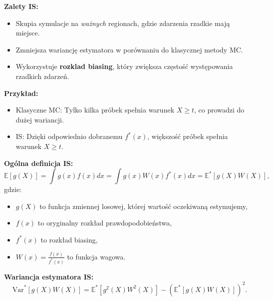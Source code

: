 \documentclass{beamer}
\begin{document}
\begin{frame}
    \textbf{Zalety IS:}
    \begin{itemize}
        \item Skupia symulacje na \textit{ważnych} regionach, gdzie zdarzenia rzadkie mają miejsce.
        \item Zmniejsza wariancję estymatora w porównaniu do klasycznej metody MC.
        \item Wykorzystuje \textbf{rozklad biasing}, który zwiększa częstość występowania rzadkich zdarzeń.
    \end{itemize}

    \vspace{0.5cm}
    \textbf{Przykład:}
    \begin{itemize}
        \item Klasyczne MC: Tylko kilka próbek spełnia warunek $X \geq t$, co prowadzi do dużej wariancji.
        \item IS: Dzięki odpowiednio dobranemu $f^*(x)$, większość próbek spełnia warunek $X \geq t$.
    \end{itemize}
\end{frame}

\begin{frame}
    \textbf{Ogólna definicja IS:}
    \[
    \mathbb{E}[g(X)] = \int g(x)f(x)dx = \int g(x)W(x)f^*(x)dx = \mathbb{E}^*[g(X)W(X)],
    \]
    gdzie:
    \begin{itemize}
        \item $g(X)$ to funkcja zmiennej losowej, której wartość oczekiwaną estymujemy,
        \item $f(x)$ to oryginalny rozkład prawdopodobieństwa,
        \item $f^*(x)$ to rozkład biasing,
        \item $W(x) = \frac{f(x)}{f^*(x)}$ to funkcja wagowa.
    \end{itemize}

    \vspace{0.5cm}
    \textbf{Wariancja estymatora IS:}
    \[
    \text{Var}^*[g(X)W(X)] = \mathbb{E}^*[g^2(X)W^2(X)] - \left(\mathbb{E}^*[g(X)W(X)]\right)^2.
    \]
\end{frame}

\end{document}
